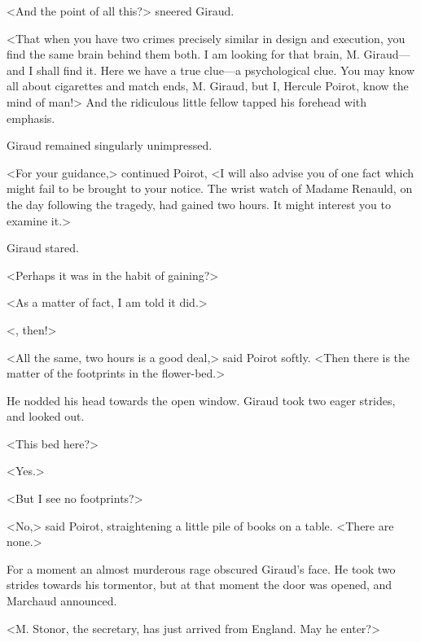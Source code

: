  <And the point of all this?> sneered Giraud. 

 <That when you have two crimes precisely similar in design and execution, you find the same brain behind them both. I am looking for that brain, M. Giraud—and I shall find it. Here we have a true clue—a psychological clue. You may know all about cigarettes and match ends, M. Giraud, but I, Hercule Poirot, know the mind of man!> And the ridiculous little fellow tapped his forehead with emphasis. 

 Giraud remained singularly unimpressed. 

 <For your guidance,> continued Poirot, <I will also advise you of one fact which might fail to be brought to your notice. The wrist watch of Madame Renauld, on the day following the tragedy, had gained two hours. It might interest you to examine it.> 

 Giraud stared. 

 <Perhaps it was in the habit of gaining?> 

 <As a matter of fact, I am told it did.> 

 <, then!> 

 <All the same, two hours is a good deal,> said Poirot softly. <Then there is the matter of the footprints in the flower-bed.> 

 He nodded his head towards the open window. Giraud took two eager strides, and looked out. 

 <This bed here?> 

 <Yes.> 

 <But I see no footprints?> 

 <No,> said Poirot, straightening a little pile of books on a table. <There are none.> 

 For a moment an almost murderous rage obscured Giraud's face. He took two strides towards his tormentor, but at that moment the  door was opened, and Marchaud announced. 

 <M. Stonor, the secretary, has just arrived from England. May he enter?>